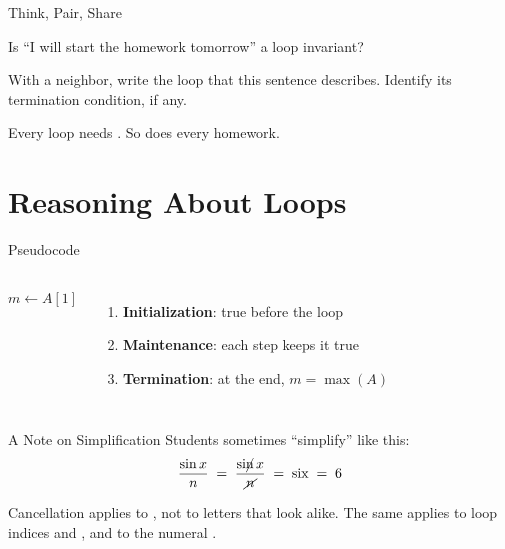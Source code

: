 \documentclass[10pt,aspectratio=169,xcolor=table]{beamer}
\begin{document}
\begin{frame}{Think, Pair, Share}
  \begin{question}
    Is ``I will start the homework tomorrow'' a loop invariant?
  \end{question}
  \pause
  \begin{tryit}
    With a neighbor, write the loop that this sentence describes.
    Identify its termination condition, if any.
  \end{tryit}
  \pause
  \begin{takeaway}
    Every loop needs .
    So does every homework.
  \end{takeaway}
\end{frame}

\section{Reasoning About Loops}

\begin{frame}{Pseudocode}
  \begin{columns}[T]
    \begin{algorithm}[H]
      \caption{FindMax}
      \BlankLine
      $m \gets A[1]$\;
      \;
    \end{algorithm}
      \begin{enumerate}
        \item<1-> \textbf{Initialization}: true before the loop
        \item<2-> \textbf{Maintenance}: each step keeps it true
        \item<3-> \textbf{Termination}: at the end, $m = \max(A)$
      \end{enumerate}
      \medskip
  \end{columns}
\end{frame}

\begin{frame}{A Note on Simplification}
  Students sometimes ``simplify'' like this:
  \[
    \frac{\sin x}{n} \;=\; \frac{\mathrm{si}\cancel{\mathrm{n}}\,x}{\cancel{n}}
      \;=\; \mathrm{six} \;=\; 6
  \]
  \pause
  \begin{pitfall}
    Cancellation applies to , not to letters that look alike.
    The same applies to loop indices  and , and to the
    numeral .
  \end{pitfall}
\end{frame}
\end{document}

